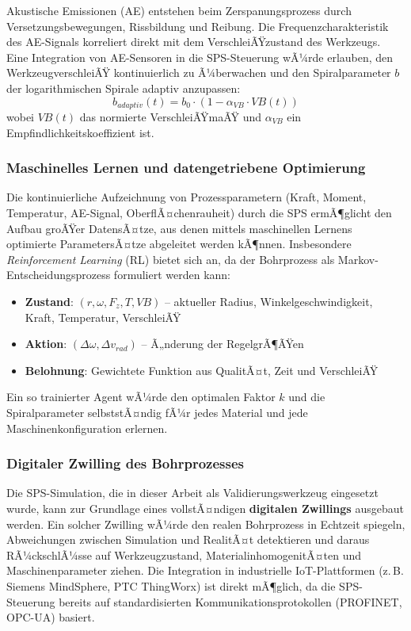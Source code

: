 ﻿\documentclass[12pt,a4paper]{article}
\begin{document}
Akustische Emissionen (AE) entstehen beim Zerspanungsprozess durch Versetzungsbewegungen, Rissbildung und Reibung. Die Frequenzcharakteristik des AE-Signals korreliert direkt mit dem VerschleiÃŸzustand des Werkzeugs. Eine Integration von AE-Sensoren in die SPS-Steuerung wÃ¼rde erlauben, den WerkzeugverschleiÃŸ kontinuierlich zu Ã¼berwachen und den Spiralparameter $b$ der logarithmischen Spirale adaptiv anzupassen:
\begin{equation}
    b_{adaptiv}(t) = b_0 \cdot \left(1 - \alpha_{VB} \cdot VB(t)\right)
\end{equation}
wobei $VB(t)$ das normierte VerschleiÃŸmaÃŸ und $\alpha_{VB}$ ein Empfindlichkeitskoeffizient ist.

\subsubsection{Maschinelles Lernen und datengetriebene Optimierung}

Die kontinuierliche Aufzeichnung von Prozessparametern (Kraft, Moment, Temperatur, AE-Signal, OberflÃ¤chenrauheit) durch die SPS ermÃ¶glicht den Aufbau groÃŸer DatensÃ¤tze, aus denen mittels maschinellen Lernens optimierte ParametersÃ¤tze abgeleitet werden kÃ¶nnen. Insbesondere \textit{Reinforcement Learning} (RL) bietet sich an, da der Bohrprozess als Markov-Entscheidungsprozess formuliert werden kann:
\begin{itemize}
    \item \textbf{Zustand}: $(r, \omega, F_z, T, VB)$ -- aktueller Radius, Winkelgeschwindigkeit, Kraft, Temperatur, VerschleiÃŸ
    \item \textbf{Aktion}: $(\Delta\omega, \Delta v_{rad})$ -- Ã„nderung der RegelgrÃ¶ÃŸen
    \item \textbf{Belohnung}: Gewichtete Funktion aus QualitÃ¤t, Zeit und VerschleiÃŸ
\end{itemize}
Ein so trainierter Agent wÃ¼rde den optimalen Faktor $k$ und die Spiralparameter selbststÃ¤ndig fÃ¼r jedes Material und jede Maschinenkonfiguration erlernen.

\subsubsection{Digitaler Zwilling des Bohrprozesses}

Die SPS-Simulation, die in dieser Arbeit als Validierungswerkzeug eingesetzt wurde, kann zur Grundlage eines vollstÃ¤ndigen \textbf{digitalen Zwillings} ausgebaut werden. Ein solcher Zwilling wÃ¼rde den realen Bohrprozess in Echtzeit spiegeln, Abweichungen zwischen Simulation und RealitÃ¤t detektieren und daraus RÃ¼ckschlÃ¼sse auf Werkzeugzustand, MaterialinhomogenitÃ¤ten und Maschinenparameter ziehen. Die Integration in industrielle IoT-Plattformen (z.\,B. Siemens MindSphere, PTC ThingWorx) ist direkt mÃ¶glich, da die SPS-Steuerung bereits auf standardisierten Kommunikationsprotokollen (PROFINET, OPC-UA) basiert.
\end{document}
